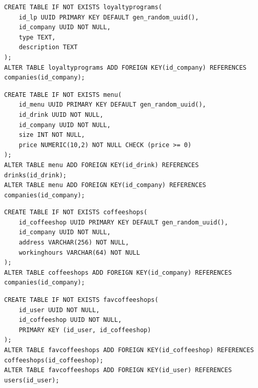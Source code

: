 \begin{center}
	\captionsetup{justification=raggedright,singlelinecheck=off}
	\begin{lstlisting}[label=create_lp,caption=Создание таблицы loyaltyprograms]
CREATE TABLE IF NOT EXISTS loyaltyprograms(
	id_lp UUID PRIMARY KEY DEFAULT gen_random_uuid(),
	id_company UUID NOT NULL,
	type TEXT,  
	description TEXT 
);  
ALTER TABLE loyaltyprograms ADD FOREIGN KEY(id_company) REFERENCES companies(id_company);
	\end{lstlisting}
\end{center}

\begin{center}
	\captionsetup{justification=raggedright,singlelinecheck=off}
	\begin{lstlisting}[label=create_menu,caption=Создание таблицы menu]
CREATE TABLE IF NOT EXISTS menu(
	id_menu UUID PRIMARY KEY DEFAULT gen_random_uuid(),
	id_drink UUID NOT NULL,
	id_company UUID NOT NULL,
	size INT NOT NULL,
	price NUMERIC(10,2) NOT NULL CHECK (price >= 0)
);
ALTER TABLE menu ADD FOREIGN KEY(id_drink) REFERENCES drinks(id_drink);
ALTER TABLE menu ADD FOREIGN KEY(id_company) REFERENCES companies(id_company);
	\end{lstlisting}
\end{center}

\begin{center}
	\captionsetup{justification=raggedright,singlelinecheck=off}
	\begin{lstlisting}[label=create_coffeeshops,caption=Создание таблицы coffeeshops]
CREATE TABLE IF NOT EXISTS coffeeshops(
	id_coffeeshop UUID PRIMARY KEY DEFAULT gen_random_uuid(),
	id_company UUID NOT NULL,
	address VARCHAR(256) NOT NULL,
	workinghours VARCHAR(64) NOT NULL
);
ALTER TABLE coffeeshops ADD FOREIGN KEY(id_company) REFERENCES companies(id_company);
	\end{lstlisting}
\end{center}

\begin{center}
	\captionsetup{justification=raggedright,singlelinecheck=off}
	\begin{lstlisting}[label=create_favcoffeeshops,caption=Создание таблицы favcoffeeshops]
CREATE TABLE IF NOT EXISTS favcoffeeshops(
	id_user UUID NOT NULL,
	id_coffeeshop UUID NOT NULL,
	PRIMARY KEY (id_user, id_coffeeshop)
);
ALTER TABLE favcoffeeshops ADD FOREIGN KEY(id_coffeeshop) REFERENCES coffeeshops(id_coffeeshop);
ALTER TABLE favcoffeeshops ADD FOREIGN KEY(id_user) REFERENCES users(id_user);
	\end{lstlisting}
\end{center}

